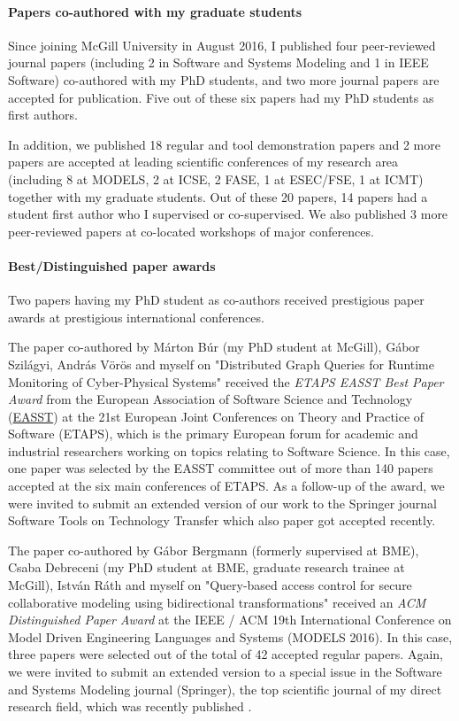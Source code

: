 \documentclass[a4paper,11pt]{report}
\begin{document}
\paragraph{Papers co-authored with my graduate students}
Since joining McGill University in August 2016, I published four peer-reviewed journal papers (including 2 in Software and Systems Modeling and 1 in IEEE Software) co-authored with my PhD students,  and two more journal papers are accepted for publication. Five out of these six papers had my PhD students as first authors. 

In addition, we published 18 regular and tool demonstration papers and 2 more papers are accepted at leading scientific conferences of my research area (including 8 at MODELS, 2 at ICSE, 2 FASE, 1 at ESEC/FSE, 1 at ICMT) together with my graduate students. Out of these 20 papers,  14 papers had a student first author who I supervised or co-supervised. 
We also published 3 more peer-reviewed papers at co-located workshops of major conferences. 

\paragraph{Best/Distinguished paper awards}
Two papers having my PhD student as co-authors received prestigious paper awards at prestigious international conferences. 

The paper co-authored by Márton Búr (my PhD student at McGill), Gábor Szilágyi, András Vörös and myself on "Distributed Graph Queries for Runtime Monitoring of Cyber-Physical Systems" \cite{fase2018-cps} received the \emph{ETAPS EASST Best Paper Award} from the European Association of Software Science and Technology (\href{http://easst.aulp.co.uk/}{EASST}) at the 21st European Joint Conferences on Theory and Practice of Software (ETAPS), which is the primary European forum for academic and industrial researchers working on topics relating to Software Science. In this case, one paper was selected by the EASST committee out of more than 140 papers accepted at the six main conferences of ETAPS. As a follow-up of the award, we were invited to submit an extended version of our work to the Springer journal Software Tools on Technology Transfer which also paper \cite{sttt-2019} got accepted recently. 

The paper co-authored by Gábor Bergmann (formerly supervised at BME), Csaba Debreceni (my PhD student at BME, graduate research trainee at McGill), István Ráth and myself on "Query-based access control for secure collaborative modeling using bidirectional transformations" \cite{MODELS2016-access} received an \emph{ACM Distinguished Paper Award} at the IEEE / ACM 19th International Conference on Model Driven Engineering Languages and Systems (MODELS 2016). In this case, three papers were selected out of the total of 42 accepted regular papers. Again, we were invited to submit an extended version to a special issue in the Software and Systems Modeling journal (Springer), the top scientific journal of my direct research field, which was recently published \cite{sosym2017-mondo}.
\end{document}
